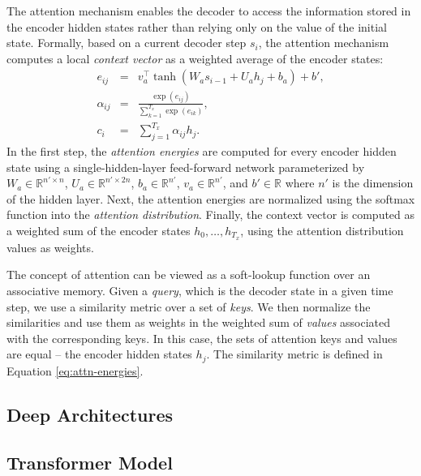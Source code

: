 The attention mechanism enables the decoder to access the information stored in
the encoder hidden states rather than relying only on the value of the initial
state.  Formally, based on a current decoder step $s_i$, the attention mechanism
computes a local \emph{context vector} as a weighted average of the encoder
states:
%
\begin{eqnarray}
  e_{ij} & = & v_a^\top \tanh (W_a s_{i-1} + U_a h_j + b_a) + b', \label{eq:attn-energies} \\
  \alpha_{ij} & = & \frac{\exp(e_{ij})}{\sum_{k=1}^{T_x}\exp(e_{ik})}, \\
  c_i & = & \sum_{j=1}^{T_x} \alpha_{ij} h_j.
\end{eqnarray}
%
In the first step, the \emph{attention energies} are computed for every encoder
hidden state using a single-hidden-layer feed-forward network parameterized by
$W_a \in \mathbb{R}^{n' \times n}$, $U_a \in \mathbb{R}^{n' \times 2n}$,
$b_a \in \mathbb{R}^{n'}$, $v_a \in \mathbb{R}^{n'}$, and $b' \in \mathbb{R}$
where $n'$ is the dimension of the hidden layer. Next, the attention energies
are normalized using the softmax function into the \emph{attention
  distribution}.  Finally, the context vector is computed as a weighted sum of
the encoder states $h_0,\ldots, h_{T_x}$, using the attention distribution
values as weights.

The concept of attention can be viewed as a soft-lookup function over an
associative memory. Given a \emph{query}, which is the decoder state in a given
time step, we use a similarity metric over a set of \emph{keys}. We then
normalize the similarities and use them as weights in the weighted sum of
\emph{values} associated with the corresponding keys. In this case, the sets of
attention keys and values are equal -- the encoder hidden states $h_j$. The
similarity metric is defined in Equation \ref{eq:attn-energies}.


\subsection{Deep Architectures}
\label{sec:deep-arch}


\subsection{Transformer Model}
\label{sec:encdec:transformer}

